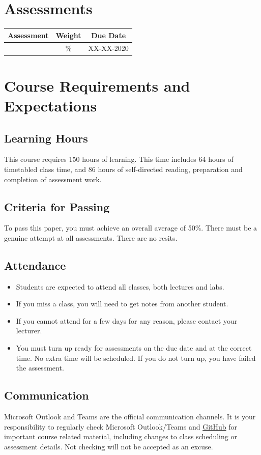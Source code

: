 \documentclass{article}
\begin{document}
\section*{Assessments}
\renewcommand{\arraystretch}{1.5}
\begin{tabular}{|c|c|c|}
  \hline
  \textbf{Assessment} & \textbf{Weight} & \textbf{Due Date} \\ \hline
            & \%            & XX-XX-2020        \\ \hline
\end{tabular}

\section*{Course Requirements and Expectations}

\subsection*{Learning Hours}
This course requires 150 hours of learning. This time includes 64 hours of timetabled class time, and 86 hours of self-directed reading, preparation and completion of assessment work.

\subsection*{Criteria for Passing}
To pass this paper, you must achieve an overall average of 50\%. There must be a genuine attempt at all assessments. There are no resits.

\subsection*{Attendance}
\begin{itemize}
  \item Students are expected to attend all classes, both lectures and labs.
  \item If you miss a class, you will need to get notes from another student.
  \item If you cannot attend for a few days for any reason, please contact your lecturer.
  \item You must turn up ready for assessments on the due date and at the correct time. No extra time will be scheduled. If you do not turn up, you have failed the assessment.
\end{itemize}

\subsection*{Communication}
Microsoft Outlook and Teams are the official communication channels. It is your responsibility to regularly check Microsoft Outlook/Teams and \href{https://github.com/Grayson-Orr/Course-Files}{GitHub} for important course related material, including changes to class scheduling or assessment details. Not checking will not be accepted as an excuse.
\end{document}
